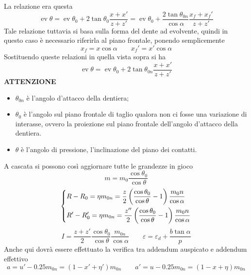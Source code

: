 \documentclass[a4paper, 15pt]{article}
\DeclareMathOperator{\ev}{ev}
\begin{document}
\begin{adjustwidth}{2in}{}
	La relazione era questa 
	\[\ev\theta = \ev\theta_0 + 2\tan\theta_0\dfrac{x+x'}{z+z'} = \ev\theta_0 + \dfrac{2\tan\theta_{0n}}{\cos\alpha}\dfrac{x_f+x_f'}{z+z'}\]
	Tale relazione tuttavia si basa sulla forma del dente ad evolvente, quindi in questo caso è necessario riferirla al piano frontale, ponendo semplicemente 
	\[x_f = x\cos\alpha \qquad x_f'=x'\cos\alpha\]
	Sostituendo queste relazioni in quella vista sopra si ha
\begin{equation}\label{eq:evtheta}
		\ev\theta = \ev\theta_0 + 2\tan\theta_{0n}\dfrac{x+x'}{z+z'}
\end{equation}
	\textbf{ATTENZIONE}
	\begin{itemize}
		\item $\theta_{0n}$ è l'angolo d'attacco della dentiera;
		\item $\theta_0$  è l'angolo sul piano frontale di taglio qualora non ci fosse una variazione di interasse, ovvero la proiezione sul piano frontale dell'angolo d'attacco della dentiera. 
		\item $\theta$ è l'angolo di pressione, l'inclinazione del piano dei contatti. 
	\end{itemize}
	A cascata si possono così aggiornare tutte le grandezze in gioco
	\[m = m_0\dfrac{\cos\theta_0}{\cos\theta}\]
	\[\begin{dcases}
		R-R_0 = \eta m_{0n} = \dfrac{z}{2}\left(\dfrac{\cos\theta_0}{\cos\theta}-1\right)\dfrac{m_0n}{\cos\alpha} \\
		R'-R_0' = \eta m_{0n} = \dfrac{z'' }{2}\left(\dfrac{\cos\theta_0}{\cos\theta}-1\right)\dfrac{m_0n}{\cos\alpha} \\
	\end{dcases}\]
	\[I = \dfrac{z+z'}{2}\dfrac{\cos\theta_0}{\cos\theta}\dfrac{m_{0n}}{\cos\alpha} \qquad \varepsilon = \varepsilon_d + \dfrac{b\tan\alpha}{p}\]
	Anche qui dovrà essere effettuato la verifica tra addendum auspicato e addendum effettivo 
	\[a = u'- 0.25m_{0n} = (1-x'+\eta')m_{0n} \qquad a' = u- 0.25m_{0n} = (1-x+\eta)m_{0n}\]
\end{adjustwidth}
\end{document}
